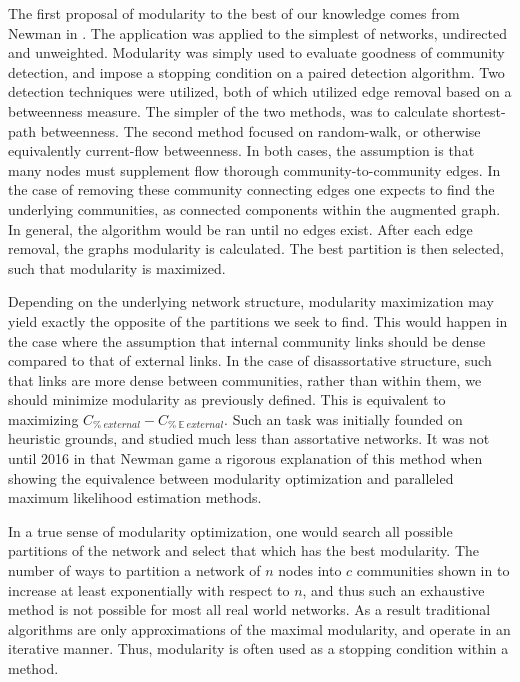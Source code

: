 \documentclass[a4paper, 10pt, twocolumn]{article}
\begin{document}
The first proposal of modularity to the best of our knowledge comes from Newman in \cite{finding_and_evaling_comm_struct}. 
The application was applied to the simplest of networks, undirected and unweighted. 
Modularity was simply used to evaluate goodness of community detection, and impose a stopping condition on a paired detection algorithm. 
Two detection techniques were utilized, both of which utilized edge removal based on a betweenness measure. 
The simpler of the two methods, was to calculate shortest-path betweenness. 
The second method focused on random-walk, or otherwise equivalently current-flow betweenness. 
In both cases, the assumption is that many nodes must supplement flow thorough community-to-community edges. 
In the case of removing these community connecting edges one expects to find the underlying communities, as connected components within the augmented graph. 
In general, the algorithm would be ran until no edges exist. 
After each edge removal, the graphs modularity is calculated. 
The best partition is then selected, such that modularity is maximized.

Depending on the underlying network structure, modularity maximization may yield exactly the opposite of the partitions we seek to find. 
This would happen in the case where the assumption that internal community links should be dense compared to that of external links. 
In the case of disassortative structure, such that links are more dense between communities, rather than within them, we should minimize modularity as previously defined. 
This is equivalent to maximizing $ C_{\% \ external} - C_{\% \ \mathbb{E} \ external} $.
Such an task was initially founded on heuristic grounds, and studied much less than assortative networks. 
It was not until 2016 in \cite{equivalence_between} that Newman game a rigorous explanation of this method when showing the equivalence between modularity optimization and paralleled maximum likelihood estimation methods. 

In a true sense of modularity optimization, one would search all possible partitions of the network and select that which has the best modularity.  
The number of ways to partition a network of $ n $ nodes into $ c $ communities shown in \cite{fast_algorithm} to increase at least exponentially with respect to $ n $, and thus such an exhaustive method is not possible for most all real world networks.
As a result traditional algorithms are only approximations of the maximal modularity, and operate in an iterative manner. 
Thus, modularity is often used as a stopping condition within a method.
\end{document}
